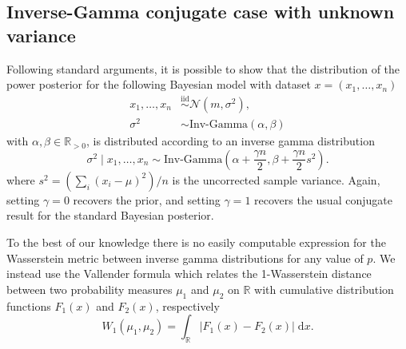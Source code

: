 \documentclass[12pt]{article}
\begin{document}
\subsection{Inverse-Gamma conjugate case with unknown variance}
Following standard arguments, it is possible to show that the distribution of
the power posterior for the following Bayesian model with dataset $x = (x_1,
\ldots, x_n)$
\begin{subequations}
\begin{align}
x_1, \ldots, x_n &\overset{\mathrm{iid}}{\sim} \mathcal{N}(m, \sigma^2), \\
\sigma^2 &\sim \text{Inv-Gamma}(\alpha, \beta)
\end{align}
\end{subequations}
with $\alpha, \beta \in \mathbb{R}_{>0}$, is distributed according to an
inverse gamma distribution
\begin{equation*}
\sigma^2 \; | \; x_1, \ldots, x_n \sim \text{Inv-Gamma}\left( \alpha + \frac{\gamma n}{2}, \beta + \frac{\gamma n}{2} s^2 \right). 
\end{equation*}
where $s^2 = (\sum_{i} \left( x_i - \mu \right)^2)/n$ is the uncorrected sample
variance. Again, setting $\gamma = 0$ recovers the prior, and setting $\gamma =
1$ recovers the usual conjugate result for the standard Bayesian posterior.

To the best of our knowledge there is no easily computable expression for the
Wasserstein metric between inverse gamma distributions for any value of $p$.
We instead use the Vallender formula which relates the 1-Wasserstein distance
between two probability measures $\mu_1$ and $\mu_2$ on $\mathbb{R}$ with
cumulative distribution functions $F_1(x)$ and $F_2(x)$, respectively
\begin{equation}
W_1(\mu_1, \mu_2) = \int_{\mathbb{R}} | F_1(x) - F_2(x) | \; \mathrm{d}x.
\end{equation}
\end{document}
